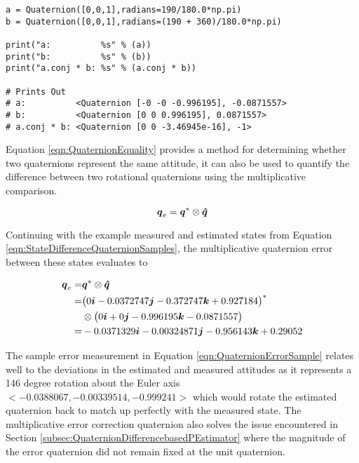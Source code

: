 \begin{singlespace}
  \begin{verbatim}
a = Quaternion([0,0,1],radians=190/180.0*np.pi)
b = Quaternion([0,0,1],radians=(190 + 360)/180.0*np.pi)

print("a:          %s" % (a))
print("b:          %s" % (b))
print("a.conj * b: %s" % (a.conj * b))

# Prints Out
# a:          <Quaternion [-0 -0 -0.996195], -0.0871557>
# b:          <Quaternion [0 0 0.996195], 0.0871557>
# a.conj * b: <Quaternion [0 0 -3.46945e-16], -1>
  \end{verbatim}
\nocite{minted}
\end{singlespace}

Equation \ref{eqn:QuaternionEquality} provides a method for determining whether two quaternions represent the same attitude, it can also be used to quantify the difference between two rotational quaternions using the multiplicative comparison.

\begin{equation}
  \boldsymbol{q}_e = \boldsymbol{q}^* \otimes \boldsymbol{\hat{q}}
  \label{eqn:QuaternionError}
\end{equation}

Continuing with the example measured and estimated states from Equation \ref{eqn:StateDifferenceQuaternionSamples}, the multiplicative quaternion error between these states evaluates to

\begin{equation}
  \begin{aligned}
    \boldsymbol{q}_e = & \boldsymbol{q}^* \otimes \boldsymbol{\hat{q}} \\
    = & \big( 0 \boldsymbol{i} -0.0372747 \boldsymbol{j} -0.372747 \boldsymbol{k} +0.927184 \big)^* \\
    & \otimes \big( 0 \boldsymbol{i} +0 \boldsymbol{j} -0.996195 \boldsymbol{k} -0.0871557 \big)\\
    = & -0.0371329 \boldsymbol{i} -0.00324871 \boldsymbol{j} -0.956143 \boldsymbol{k} +0.29052
  \end{aligned}
  \label{eqn:QuaternionErrorSample}
\end{equation}

The sample error measurement in Equation \ref{eqn:QuaternionErrorSample} relates well to the deviations in the estimated and measured attitudes as it represents a 146 degree rotation about the Euler axis $<-0.0388067, -0.00339514, -0.999241>$ which would rotate the estimated quaternion back to match up perfectly with the measured state.  The multiplicative error correction quaternion also solves the issue encountered in Section \ref{subsec:QuaternionDifferencebasedPEstimator} where the magnitude of the error quaternion did not remain fixed at the unit quaternion.

